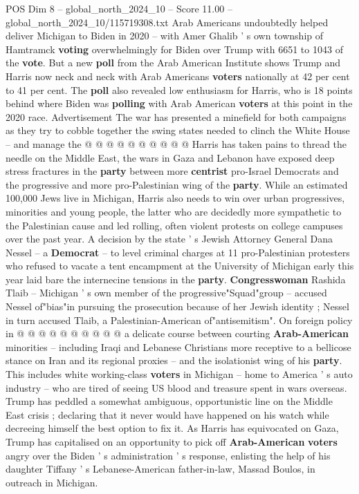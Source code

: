 \begin{textsample}{POS Dim 8 – global\_north\_2024\_10 – Score 11.00 – global\_north\_2024\_10/115719308.txt}
Arab Americans undoubtedly helped deliver Michigan to Biden in 2020 -- with Amer Ghalib ' s own township of Hamtramck \textbf{voting} overwhelmingly for Biden over Trump with 6651 to 1043 of the \textbf{vote}.
But a new \textbf{poll} from the Arab American Institute shows Trump and Harris now neck and neck with Arab Americans \textbf{voters} nationally at 42 per cent to 41 per cent.
The \textbf{poll} also revealed low enthusiasm for Harris, who is 18 points behind where Biden was \textbf{polling} with Arab American \textbf{voters} at this point in the 2020 race.
Advertisement The war has presented a minefield for both campaigns as they try to cobble together the swing states needed to clinch the White House -- and manage the @ @ @ @ @ @ @ @ @ @ Harris has taken pains to thread the needle on the Middle East, the wars in Gaza and Lebanon have exposed deep stress fractures in the \textbf{party} between more \textbf{centrist} pro-Israel Democrats and the progressive and more pro-Palestinian wing of the \textbf{party}.
While an estimated 100,000 Jews live in Michigan, Harris also needs to win over urban progressives, minorities and young people, the latter who are decidedly more sympathetic to the Palestinian cause and led rolling, often violent protests on college campuses over the past year.
A decision by the state ' s Jewish Attorney General Dana Nessel -- a \textbf{Democrat} -- to level criminal charges at 11 pro-Palestinian protesters who refused to vacate a tent encampment at the University of Michigan early this year laid bare the internecine tensions in the \textbf{party}. \textbf{Congresswoman} Rashida Tlaib -- Michigan ' s own member of the progressive"Squad"group -- accused Nessel of"bias"in pursuing the prosecution because of her Jewish identity ; Nessel in turn accused Tlaib, a Palestinian-American of"antisemitism".
On foreign policy in @ @ @ @ @ @ @ @ @ @ a delicate course between courting \textbf{Arab-American} minorities -- including Iraqi and Lebanese Christians more receptive to a bellicose stance on Iran and its regional proxies -- and the isolationist wing of his \textbf{party}.
This includes white working-class \textbf{voters} in Michigan -- home to America ' s auto industry -- who are tired of seeing US blood and treasure spent in wars overseas.
Trump has peddled a somewhat ambiguous, opportunistic line on the Middle East crisis ; declaring that it never would have happened on his watch while decreeing himself the best option to fix it.
As Harris has equivocated on Gaza, Trump has capitalised on an opportunity to pick off \textbf{Arab-American} \textbf{voters} angry over the Biden ' s administration ' s response, enlisting the help of his daughter Tiffany ' s Lebanese-American father-in-law, Massad Boulos, in outreach in Michigan.

\end{textsample}
